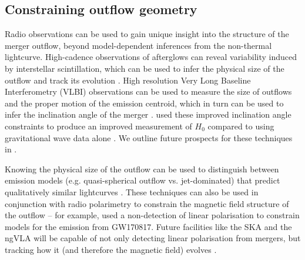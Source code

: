 \subsection{Constraining outflow geometry}
\label{subsec:outflow_geometry}
\vspace{-3pt}
Radio observations can be used to gain unique insight into the structure of the merger outflow, beyond model-dependent inferences from the non-thermal lightcurve. High-cadence observations of afterglows can reveal variability induced by interstellar scintillation, which can be used to infer the physical size of the outflow and track its evolution \citep{1997Natur.389..261F,1997NewA....2..449G,2008ApJ...683..924C}. High resolution Very Long Baseline Interferometry (VLBI) observations can be used to measure the size of outflows and the proper motion of the emission centroid, which in turn can be used to infer the inclination angle of the merger \citep{2018Natur.561..355M,2019Sci...363..968G,2020arXiv200501754N}. \citet{2019NatAs...3..940H} used these improved inclination angle constraints to produce an improved measurement of $H_0$ compared to using gravitational wave data alone \citep{2017Natur.551...85A}. We outline future prospects for these techniques in \citet{2020MNRAS.494.2449D}.

Knowing the physical size of the outflow can be used to distinguish between emission models (e.g. quasi-spherical outflow vs. jet-dominated) that predict qualitatively similar lightcurves \citep{2018MNRAS.478.4128G,2018MNRAS.478..407N}. These techniques can also be used in conjunction with radio polarimetry to constrain the magnetic field structure of the outflow -- for example, \citet{2018ApJ...861L..10C} used a non-detection of linear polarisation to constrain models for the emission from GW170817. Future facilities like the SKA and the ngVLA will be capable of not only detecting linear polarisation from mergers, but tracking how it (and therefore the magnetic field) evolves \citep{2018ASPC..517..689C}.
\vspace{-12pt}
